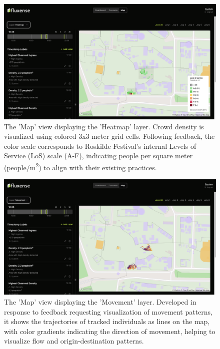 \begin{figure}[ht]
  \centering
  \includegraphics[width=\textwidth]{Pictures/Misc/Frontend/map_density.png}
  \caption{The 'Map' view displaying the 'Heatmap' layer. Crowd density is visualized using colored 3x3 meter grid cells. Following feedback, the color scale corresponds to Roskilde Festival's internal Levels of Service (LoS) scale (A-F), indicating people per square meter (people/m\textsuperscript{2}) to align with their existing practices.}
\end{figure}

\begin{figure}[ht]
  \centering
  \includegraphics[width=\textwidth]{Pictures/Misc/Frontend/map_movement.png}
  \caption{The 'Map' view displaying the 'Movement' layer. Developed in response to feedback requesting visualization of movement patterns, it shows the trajectories of tracked individuals as lines on the map, with color gradients indicating the direction of movement, helping to visualize flow and origin-destination patterns.}
\end{figure}

